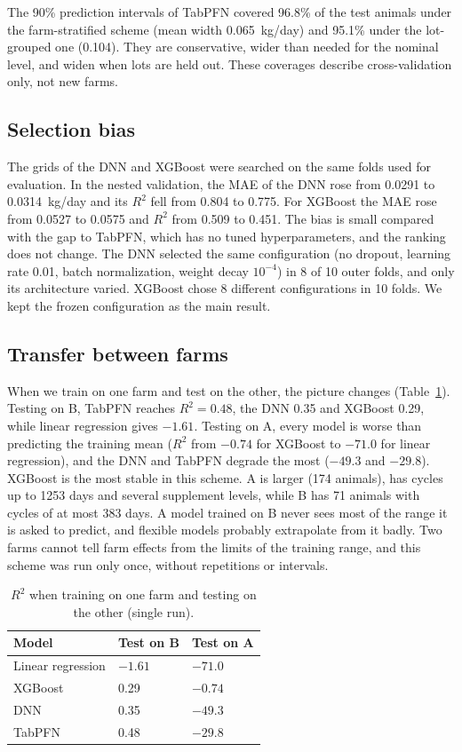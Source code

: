 \documentclass[runningheads]{llncs}
\begin{document}
The 90\% prediction intervals of TabPFN covered 96.8\% of the test animals under the farm-stratified scheme (mean width 0.065~kg/day) and 95.1\% under the lot-grouped one (0.104). They are conservative, wider than needed for the nominal level, and widen when lots are held out. These coverages describe cross-validation only, not new farms.

\subsection{Selection bias}

The grids of the DNN and XGBoost were searched on the same folds used for evaluation. In the nested validation, the MAE of the DNN rose from 0.0291 to 0.0314~kg/day and its $R^2$ fell from 0.804 to 0.775. For XGBoost the MAE rose from 0.0527 to 0.0575 and $R^2$ from 0.509 to 0.451. The bias is small compared with the gap to TabPFN, which has no tuned hyperparameters, and the ranking does not change. The DNN selected the same configuration (no dropout, learning rate 0.01, batch normalization, weight decay $10^{-4}$) in 8 of 10 outer folds, and only its architecture varied. XGBoost chose 8 different configurations in 10 folds. We kept the frozen configuration as the main result.

\subsection{Transfer between farms}

When we train on one farm and test on the other, the picture changes (Table~\ref{tab:lopo}). Testing on B, TabPFN reaches $R^2=0.48$, the DNN 0.35 and XGBoost 0.29, while linear regression gives $-1.61$. Testing on A, every model is worse than predicting the training mean ($R^2$ from $-0.74$ for XGBoost to $-71.0$ for linear regression), and the DNN and TabPFN degrade the most ($-49.3$ and $-29.8$). XGBoost is the most stable in this scheme. A is larger (174 animals), has cycles up to 1253 days and several supplement levels, while B has 71 animals with cycles of at most 383 days. A model trained on B never sees most of the range it is asked to predict, and flexible models probably extrapolate from it badly. Two farms cannot tell farm effects from the limits of the training range, and this scheme was run only once, without repetitions or intervals.

\begin{table}
\caption{$R^2$ when training on one farm and testing on the other (single run).}\label{tab:lopo}
\begin{tabular}{p{4.0cm}p{3.0cm}p{3.0cm}}
\hline
Model & Test on B & Test on A\\
\hline
Linear regression & $-1.61$ & $-71.0$\\
XGBoost & 0.29 & $-0.74$\\
DNN & 0.35 & $-49.3$\\
TabPFN & 0.48 & $-29.8$\\
\hline
\end{tabular}
\end{table}
\end{document}
